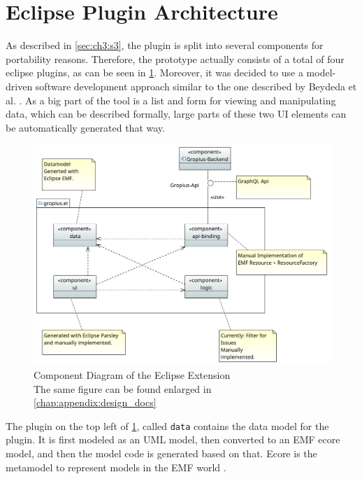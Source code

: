 \section{Eclipse Plugin Architecture}
\label{sec:ch4:s3}
As described in \cref{sec:ch3:s3}, the plugin is split into several components for portability reasons.
Therefore, the prototype actually consists of a total of four eclipse plugins, as can be seen in \cref{fig:c4:component_diagram}.
Moreover, it was decided to use a model-driven software development approach similar to the one described by Beydeda et al. \cite{beydeda2005model}.
As a big part of the tool is a list and form for viewing and manipulating data, which can be described formally,
large parts of these two \gls{UI} elements can be automatically generated that way.

\begin{figure}[!h]
	\centering
	\includegraphics[width=\textwidth]{graphics/Component_Diagram.png}
	\caption{Component Diagram of the Eclipse Extension \\ \footnotesize{The same figure can be found enlarged in \cref{chap:appendix:design_docs}}}
	\label{fig:c4:component_diagram}
\end{figure}

The plugin on the top left of \cref{fig:c4:component_diagram}, called \lstinline|data| contains the data model for the plugin. 
It is first modeled as an \gls{UML} model, then converted to an \gls{EMF} ecore model, and then the model code is generated based on that.
Ecore is the metamodel to represent models in the \gls{EMF} world \cite{steinberg2008emf}.

